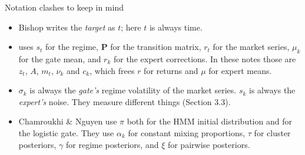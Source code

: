 \begin{warnbox}{Notation clashes to keep in mind}
\begin{itemize}
  \item Bishop writes the \emph{target} as $t$; here $t$ is always time.
  \item {} uses $s_t$ for the regime, $\mathbf P$ for the transition matrix, $r_t$ for the market series, $\mu_k$ for the gate mean, and $r_k$ for the expert corrections. In these notes those are $z_t$, $A$, $m_t$, $\nu_k$ and $c_k$, which frees $r$ for returns and $\mu$ for expert means.
  \item $\sigma_k$ is always the \emph{gate's} regime volatility of the market series. $s_k$ is always the \emph{expert's} noise. They measure different things (Section 3.3).
  \item Chamroukhi \& Nguyen use $\pi$ both for the HMM initial distribution and for the logistic gate. They use $\alpha_k$ for constant mixing proportions, $\tau$ for cluster posteriors, $\gamma$ for regime posteriors, and $\xi$ for pairwise posteriors.
\end{itemize}
\end{warnbox}
\newpage
